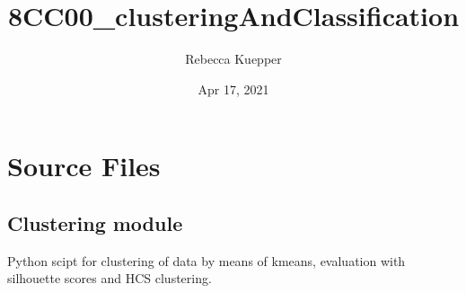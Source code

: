 \documentclass[letterpaper,10pt,english]{sphinxmanual}
\title{8CC00\_clusteringAndClassification}
\date{Apr 17, 2021}
\author{Rebecca Kuepper}
\begin{document}
\pagestyle{empty}
\sphinxmaketitle
\pagestyle{plain}
\sphinxtableofcontents
\pagestyle{normal}
\label{\detokenize{index::doc}}



\chapter{Source Files}
\label{\detokenize{modules:source-files}}\label{\detokenize{modules::doc}}

\section{Clustering module}
\label{\detokenize{clustering:module-clustering}}\label{\detokenize{clustering:clustering-module}}\label{\detokenize{clustering::doc}}
\sphinxAtStartPar
Python scipt for clustering of data by means of k\sphinxhyphen{}means, evaluation with silhouette scores and HCS clustering.
\end{document}
